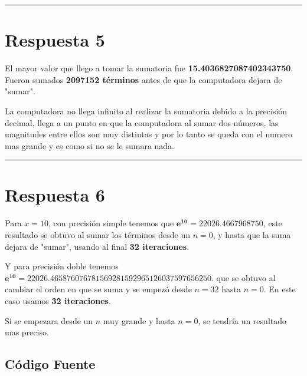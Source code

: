 \documentclass{article}
\begin{document}
\hrule
\section*{Respuesta 5}
El mayor valor que llego a tomar la sumatoria fue \textbf{15.4036827087402343750}.
Fueron sumados \textbf{2097152 términos} antes de que la computadora dejara de "sumar".

La computadora no llega infinito al realizar la sumatoria debido
a la precisión decimal, llega a un punto en que la computadora al sumar dos números, las magnitudes entre ellos
son muy distintas y por lo tanto se queda con el numero mas grande y es como si no se le sumara nada.
\vspace{0.3cm}


\hrule
\section*{Respuesta 6}
Para $x = 10$, con precisión simple tenemos que $\boldsymbol{e^{10} = 22026.4667968750}$,
este resultado se obtuvo al sumar los términos desde un $n = 0$, y hasta que la suma dejara de "sumar",
usando al final \textbf{32 iteraciones}.

Y para precisión doble tenemos $\boldsymbol{e^{10} = 22026.465876076781569281592965126037597656250}$.
que se obtuvo al cambiar el orden en que se suma y se empezó desde $n = 32$ hasta $n = 0$. 
En este caso usamos \textbf{32 iteraciones}.

Si se empezara desde un $n$ muy grande y hasta $n = 0$, se tendría un resultado mas preciso.





\newpage
\begin{centering}
	\section*{Código Fuente}
\end{centering}
\end{document}
